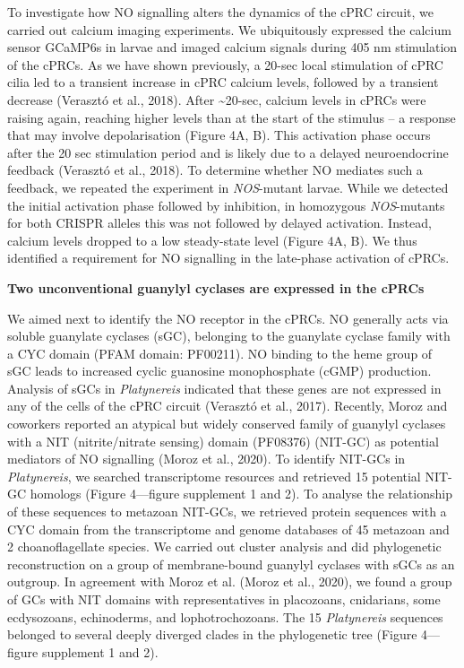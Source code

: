 \documentclass[
  10pt,
  onecolumn]{article}
\begin{document}
To investigate how NO signalling alters the dynamics of the cPRC
circuit, we carried out calcium imaging experiments. We ubiquitously
expressed the calcium sensor GCaMP6s in larvae and imaged calcium
signals during 405 nm stimulation of the cPRCs. As we have shown
previously, a 20-sec local stimulation of cPRC cilia led to a transient
increase in cPRC calcium levels, followed by a transient decrease
(Verasztó et al., 2018). After \textasciitilde20-sec, calcium levels in
cPRCs were raising again, reaching higher levels than at the start of
the stimulus -- a response that may involve depolarisation (Figure 4A,
B). This activation phase occurs after the 20 sec stimulation period and
is likely due to a delayed neuroendocrine feedback (Verasztó et al.,
2018). To determine whether NO mediates such a feedback, we repeated the
experiment in \emph{NOS}-mutant larvae. While we detected the initial
activation phase followed by inhibition, in homozygous
\emph{NOS}-mutants for both CRISPR alleles this was not followed by
delayed activation. Instead, calcium levels dropped to a low
steady-state level (Figure 4A, B). We thus identified a requirement for
NO signalling in the late-phase activation of cPRCs.

\textbf{Two unconventional guanylyl cyclases are expressed in the cPRCs}

We aimed next to identify the NO receptor in the cPRCs. NO generally
acts via soluble guanylate cyclases (sGC), belonging to the guanylate
cyclase family with a CYC domain (PFAM domain: PF00211). NO binding to
the heme group of sGC leads to increased cyclic guanosine monophosphate
(cGMP) production. Analysis of sGCs in \emph{Platynereis} indicated that
these genes are not expressed in any of the cells of the cPRC circuit
(Verasztó et al., 2017). Recently, Moroz and coworkers reported an
atypical but widely conserved family of guanylyl cyclases with a NIT
(nitrite/nitrate sensing) domain (PF08376) (NIT-GC) as potential
mediators of NO signalling (Moroz et al., 2020). To identify NIT-GCs in
\emph{Platynereis}, we searched transcriptome resources and retrieved 15
potential NIT-GC homologs (Figure 4---figure supplement 1 and 2). To
analyse the relationship of these sequences to metazoan NIT-GCs, we
retrieved protein sequences with a CYC domain from the transcriptome and
genome databases of 45 metazoan and 2 choanoflagellate species. We
carried out cluster analysis and did phylogenetic reconstruction on a
group of membrane-bound guanylyl cyclases with sGCs as an outgroup. In
agreement with Moroz et al. (Moroz et al., 2020), we found a group of
GCs with NIT domains with representatives in placozoans, cnidarians,
some ecdysozoans, echinoderms, and lophotrochozoans. The 15
\emph{Platynereis} sequences belonged to several deeply diverged clades
in the phylogenetic tree (Figure 4---figure supplement 1 and 2).
\end{document}
